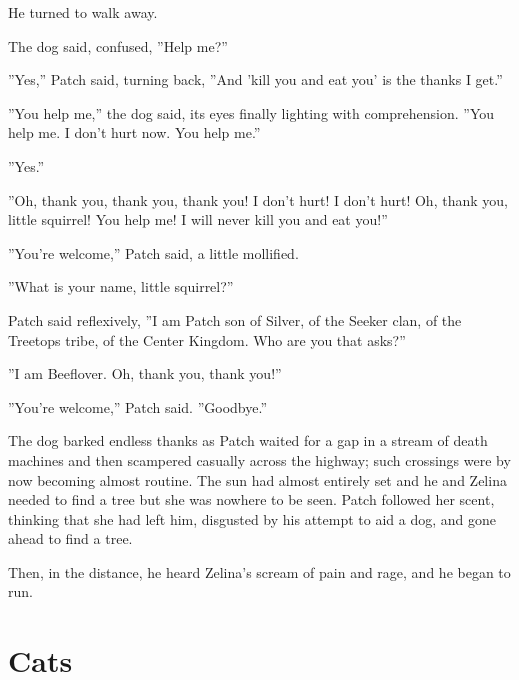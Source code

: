 \documentclass[12pt]{book}
\begin{document}
 He turned to walk away.\par
 The dog said, confused, ''Help me?''\par
 ''Yes,'' Patch said, turning back, ''And 'kill you and eat you' is the thanks I get.''\par
 ''You help me,'' the dog said, its eyes finally lighting with comprehension. ''You help me. I don't hurt now. You help me.''\par
 ''Yes.''\par
 ''Oh, thank you, thank you, thank you! I don't hurt! I don't hurt! Oh, thank you, little squirrel! You help me! I will never kill you and eat you!''\par
 ''You're welcome,'' Patch said, a little mollified.\par
 ''What is your name, little squirrel?''\par
 Patch said reflexively, ''I am Patch son of Silver, of the Seeker clan, of the Treetops tribe, of the Center Kingdom. Who are you that asks?''\par
 ''I am Beeflover. Oh, thank you, thank you!''\par
 ''You're welcome,'' Patch said. ''Goodbye.''\par
 The dog barked endless thanks as Patch waited for a gap in a stream of death machines and then scampered casually across the highway; such crossings were by now becoming almost routine. The sun had almost entirely set and he and Zelina needed to find a tree %
 but she was nowhere to be seen. Patch followed her scent, thinking that she had left him, disgusted by his attempt to aid a dog, and gone ahead to find a tree.\par
 Then, in the distance, he heard Zelina's scream of pain and rage, and he began to run.\par

\section{Cats}
\end{document}
